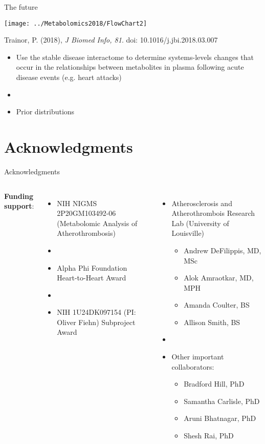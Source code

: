 \documentclass[xcolor=dvipsnames]{beamer}
\begin{document}
\begin{frame}{The future}
	\vspace{-15pt}
	\begin{center}
		\texttt{[image: ../Metabolomics2018/FlowChart2]}
		
		Trainor, P. (2018), \emph{J Biomed Info, 81}. doi: 10.1016/j.jbi.2018.03.007 \pause
	\end{center}
	\begin{itemize}
		\item Use the stable disease interactome to determine systems-levels changes that occur in the relationships between metabolites in plasma following acute disease events (e.g. heart attacks) \pause
		\item[]
		\item Prior distributions 
	\end{itemize}
\end{frame}

\section{Acknowledgments}

\begin{frame}{Acknowledgments}
	\begin{columns}
			\textbf{Funding support}:
			\begin{itemize}
				\item NIH NIGMS 2P20GM103492-06 (Metabolomic Analysis of Atherothrombosis)
				\item[]
				\item Alpha Phi Foundation Heart-to-Heart Award
				\item[]
				\item NIH 1U24DK097154 (PI: Oliver Fiehn) Subproject Award
			\end{itemize}
			\begin{itemize}
				\item Atherosclerosis and Atherothrombois Research Lab (University of Louisville)
				\begin{itemize}
					\item Andrew DeFilippis, MD, MSc
					\item Alok Amraotkar, MD, MPH
					\item Amanda Coulter, BS
					\item Allison Smith, BS
				\end{itemize}
				\item[]
				\item Other important collaborators:
				\begin{itemize}
					\item Bradford Hill, PhD
					\item Samantha Carlisle, PhD
					\item Aruni Bhatnagar, PhD
					\item Shesh Rai, PhD
				\end{itemize}
			\end{itemize}
	\end{columns}
\end{frame}
\end{document}
